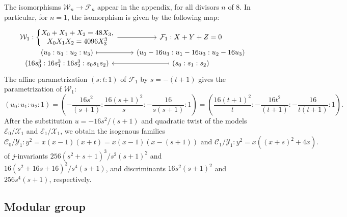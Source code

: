\documentclass{amsart}
\newcommand{\cC}{\mathcal{C}}
\newcommand{\cE}{\mathcal{E}}
\newcommand{\cF}{\mathcal{F}}
\newcommand{\cX}{\mathcal{X}}
\newcommand{\cY}{\mathcal{Y}}
\newcommand{\cW}{\mathcal{W}}
\begin{document}
The isomorphisms $\cW_n \to \cF_n$ appear in the appendix, for all divisors $n$ of $8$. In particular,
for $n = 1$, the isomorphism is given by the following map:
\begin{equation}
  \label{eqn:Weber1-Fermat1-isom}
\begin{tikzcd}[row sep=-2mm,column sep=8mm]
  \cW_1: \left\{
  \begin{array}{@{}c@{}}
    X_0 + X_1 + X_2 = 48 X_3,\\
    X_0 X_1 X_2 = 4096 X_3^3
  \end{array} \right. \arrow[r] & \cF_1 : X + Y + Z = 0\\[1mm]
  (u_0:u_1:u_2:u_3) \arrow[r,mapsto] & (u_0-16u_3 : u_1-16u_3 : u_2-16u_3)\\[1mm]
  (16s_0^3:16s_1^3:16s_2^3:s_0s_1s_2) & \arrow[l,mapsto] (s_0:s_1:s_2)
\end{tikzcd}
\end{equation}
The affine parametrization $(s:t:1)$ of $\cF_1$ by $s = -(t+1)$ gives the parametrization
of $\cW_1$:
$$
  (u_0:u_1:u_2:1)
  = %
  \left( -\frac{16s^2}{(s+1)}: \frac{16(s+1)^2}{s}:  -\frac{16}{s(s+1)}: 1\right)
  = %
  \left( \frac{16(t+1)^2}{t}: -\frac{16t^2}{(t+1)}:  -\frac{16}{t(t+1)}: 1\right).
$$
After the substitution $u = -16s^2/(s+1)$ and quadratic twist of the models $\cE_0/\cX_1$ and $\cE_1/\cX_1$, we obtain
the isogenous families
\begin{equation}
  \label{eqn:C0/Y1-C1/Y1}
\cC_0/\cY_1: y^2 = x(x - 1)(x + t) = x(x - 1)(x - (s + 1))
\mbox{ and }
\cC_1/\cY_1: y^2 = x((x + s)^2 + 4x).
\end{equation}
of $j$-invariants $256(s^2+s+1)^3/s^2(s+1)^2$ and $16(s^2+16s+16)^3/s^4(s+1)$, and discriminants
$16s^2(s+1)^2$ and $256s^4(s+1)$, respectively.

\subsection*{Modular group}
\end{document}

